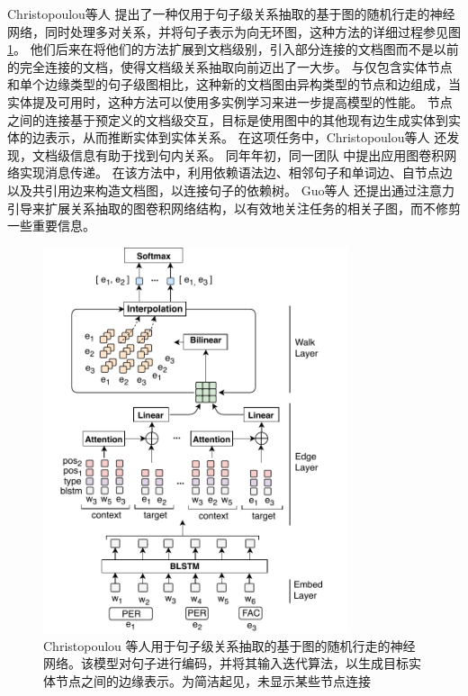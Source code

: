 \documentclass[bachelor]{thesis-uestc}
\begin{document}
Christopoulou等人 \cite{christopoulou-etal-2018-walk} 提出了一种仅用于句子级关系抽取的基于图的随机行走的神经网络，同时处理多对关系，并将句子表示为向无环图，这种方法的详细过程参见图 \ref{fig:christopoulou}。
他们后来在将他们的方法扩展到文档级别，引入部分连接的文档图而不是以前的完全连接的文档，使得文档级关系抽取向前迈出了一大步。
与仅包含实体节点和单个边缘类型的句子级图相比，这种新的文档图由异构类型的节点和边组成，当实体提及可用时，这种方法可以使用多实例学习来进一步提高模型的性能。
节点之间的连接基于预定义的文档级交互，目标是使用图中的其他现有边生成实体到实体的边表示，从而推断实体到实体关系。
在这项任务中，Christopoulou等人 \cite{christopoulou-etal-2019-connecting}还发现，文档级信息有助于找到句内关系。
同年年初，同一团队 \cite{sahu2019inter}中提出应用图卷积网络实现消息传递。
在该方法中，利用依赖语法边、相邻句子和单词边、自节点边以及共引用边来构造文档图，以连接句子的依赖树。
Guo等人 \cite{guo-etal-2019-attention}还提出通过注意力引导来扩展关系抽取的图卷积网络结构，以有效地关注任务的相关子图，而不修剪一些重要信息。\par
\begin{figure}
    \centering
    \includegraphics[width=0.8\textwidth]{misc/graph_model.pdf}
    \caption{Christopoulou \cite{christopoulou-etal-2018-walk} 等人用于句子级关系抽取的基于图的随机行走的神经网络。该模型对句子进行编码，并将其输入迭代算法，以生成目标实体节点之间的边缘表示。为简洁起见，未显示某些节点连接}
    \label{fig:christopoulou}
\end{figure}
\end{document}
